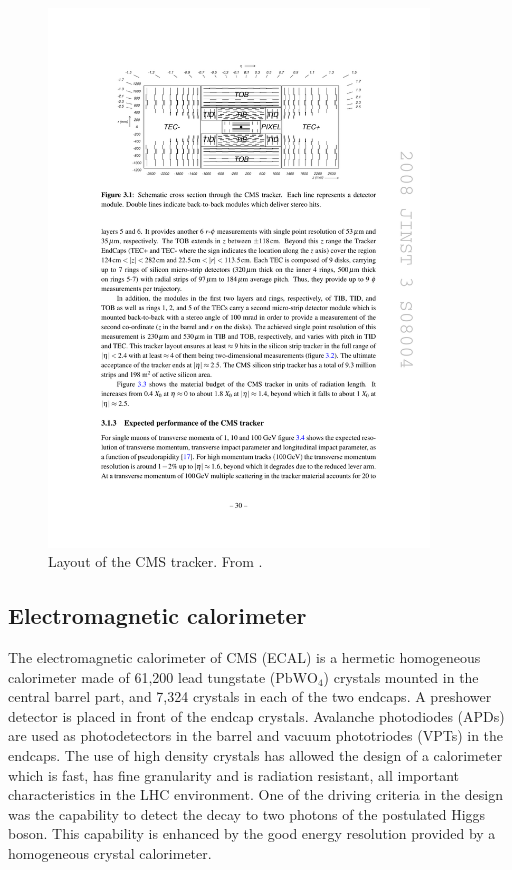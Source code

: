 \begin{figure}[hbtp]
\centering
\includegraphics[width=0.9\textwidth]{figures/cms_tracker.pdf}
\caption{Layout of the CMS tracker. From \cite{Chatrchyan:2008aa}.}
\label{fig:cms_tracker}
\end{figure}

\subsection{Electromagnetic calorimeter}
The electromagnetic calorimeter of CMS (ECAL) is a hermetic homogeneous calorimeter made of
61,200 lead tungstate ($\textrm{PbWO}_{\textrm{4}}$) crystals mounted in the central barrel part,
and 7,324 crystals in each of the two endcaps. 
A preshower detector is placed in front of the endcap crystals.
Avalanche photodiodes (APDs) are used as photodetectors in the barrel and vacuum phototriodes
(VPTs) in the endcaps. The use of high density crystals has allowed the design of a calorimeter
which is fast, has fine granularity and is radiation resistant, all important characteristics in the LHC
environment. 
One of the driving criteria in the design was the capability to detect the decay to two
photons of the postulated Higgs boson.
This capability is enhanced by the good energy resolution
provided by a homogeneous crystal calorimeter.

